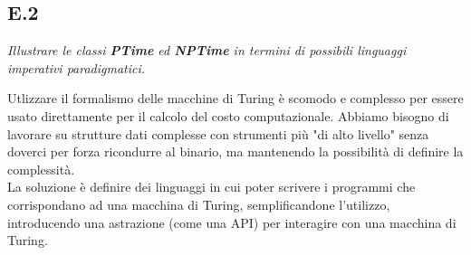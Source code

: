 \documentclass[a4paper]{article}
\begin{document}
\subsection{E.2}
\emph{Illustrare le classi \textbf{PTime} ed \textbf{NPTime} in termini di possibili linguaggi imperativi paradigmatici.}


Utlizzare il formalismo delle macchine di Turing è scomodo e complesso per essere usato direttamente per il calcolo del costo computazionale.
Abbiamo bisogno di lavorare su strutture dati complesse con strumenti più "di alto livello" senza doverci per forza ricondurre al binario, ma mantenendo la possibilità di definire la complessità.\\
La soluzione è definire dei linguaggi in cui poter scrivere i programmi che corrispondano ad una macchina di Turing, semplificandone l'utilizzo, introducendo una astrazione (come una API) per interagire con una macchina di Turing.
\end{document}
